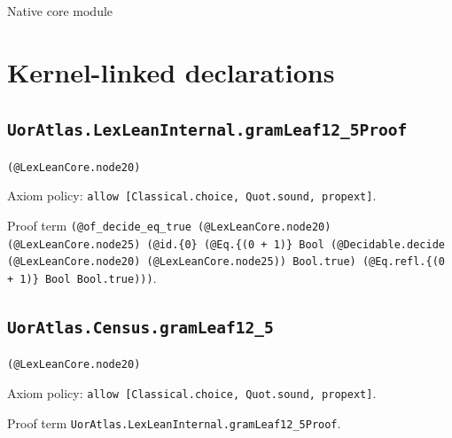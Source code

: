 \documentclass[11pt]{article}
\begin{document}
\begin{center}{\LARGE Native core module}\end{center}
\section*{Kernel-linked declarations}
\subsection*{\texttt{UorAtlas.LexLeanInternal.gramLeaf12\_5Proof}}
\noindent\texttt{(@LexLeanCore.node20)}\par
\noindent Axiom policy: \texttt{allow [Classical.choice, Quot.sound, propext]}.\par
\noindent Proof term \texttt{(@of\_decide\_eq\_true (@LexLeanCore.node20) (@LexLeanCore.node25) (@id.\{0\} (@Eq.\{(0 + 1)\} Bool (@Decidable.decide (@LexLeanCore.node20) (@LexLeanCore.node25)) Bool.true) (@Eq.refl.\{(0 + 1)\} Bool Bool.true)))}.\par
\subsection*{\texttt{UorAtlas.Census.gramLeaf12\_5}}
\noindent\texttt{(@LexLeanCore.node20)}\par
\noindent Axiom policy: \texttt{allow [Classical.choice, Quot.sound, propext]}.\par
\noindent Proof term \texttt{UorAtlas.LexLeanInternal.gramLeaf12\_5Proof}.\par
\end{document}

